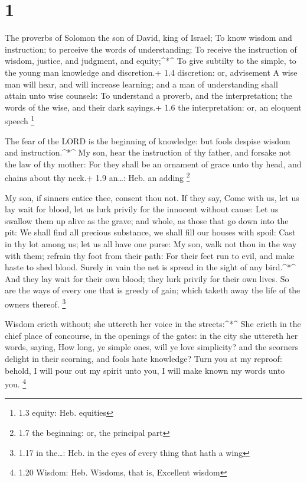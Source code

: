 \hypertarget{section}{%
\section{1}\label{section}}

 The proverbs of Solomon the son of David, king of Israel;
 To know wisdom and instruction; to perceive the words of
understanding;  To receive the instruction of wisdom,
justice, and judgment, and equity;\^{}*\^{}  To give
subtilty to the simple, to the young man knowledge and discretion.+ 1.4
discretion: or, advisement  A wise man will hear, and will
increase learning; and a man of understanding shall attain unto wise
counsels:  To understand a proverb, and the interpretation;
the words of the wise, and their dark sayings.+ 1.6 the interpretation:
or, an eloquent speech \footnote{1.3 equity: Heb. equities}

 The fear of the LORD is the beginning of knowledge: but
fools despise wisdom and instruction.\^{}*\^{}  My son, hear
the instruction of thy father, and forsake not the law of thy mother:
 For they shall be an ornament of grace unto thy head, and
chains about thy neck.+ 1.9 an\ldots: Heb. an adding \footnote{1.7 the
  beginning: or, the principal part}

 My son, if sinners entice thee, consent thou not.
 If they say, Come with us, let us lay wait for blood, let
us lurk privily for the innocent without cause:  Let us
swallow them up alive as the grave; and whole, as those that go down
into the pit:  We shall find all precious substance, we
shall fill our houses with spoil:  Cast in thy lot among
us; let us all have one purse:  My son, walk not thou in
the way with them; refrain thy foot from their path:  For
their feet run to evil, and make haste to shed blood. 
Surely in vain the net is spread in the sight of any bird.\^{}*\^{}
 And they lay wait for their own blood; they lurk privily
for their own lives.  So are the ways of every one that is
greedy of gain; which taketh away the life of the owners thereof.
\footnote{1.17 in the\ldots: Heb. in the eyes of every thing that hath a
  wing}

 Wisdom crieth without; she uttereth her voice in the
streets:\^{}*\^{}  She crieth in the chief place of
concourse, in the openings of the gates: in the city she uttereth her
words, saying,  How long, ye simple ones, will ye love
simplicity? and the scorners delight in their scorning, and fools hate
knowledge?  Turn you at my reproof: behold, I will pour out
my spirit unto you, I will make known my words unto you. \footnote{1.20
  Wisdom: Heb. Wisdoms, that is, Excellent wisdom}

